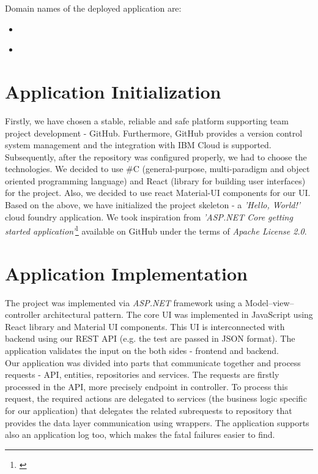 \documentclass[11pt,a4paper]{article}
\begin{document}
Domain names of the deployed application are:
\begin{itemize}
    \item \href{https://pa181.eu-de.mybluemix.net/}{\color{urlColor}{pa181.eu-de.mybluemix.net}}
    \item \href{https://pa181.eu-de.cf.appdomain.cloud/}{\color{urlColor}{pa181.eu-de.cf.appdomain.cloud}}
\end{itemize}

\section{Application Initialization}

Firstly, we have chosen a stable, reliable and safe platform supporting team project development - GitHub. Furthermore, GitHub provides a version control system management and the integration with IBM Cloud is supported. Subsequently, after the repository was configured properly, we had to choose the technologies. We decided to use \#C (general-purpose, multi-paradigm and object oriented programming language) and React (library for building user interfaces) for the project. Also, we decided to use react Material-UI components for our UI. Based on the above, we have initialized the project skeleton - a \textit{'Hello, World!'} cloud foundry application. We took inspiration from \textit{'ASP.NET Core getting started application'}\footnote{\href{https://github.com/IBM-Cloud/aspnet-core-helloworld}{\color{urlColor}{github.com/IBM-Cloud/aspnet-core-helloworld}}} available on GitHub under the terms of \textit{Apache License 2.0}.

\section{Application Implementation}

The project was implemented via \textit{ASP.NET} framework using a Model--view--controller architectural pattern. The core UI was implemented in JavaScript using React library and Material UI components. This UI is interconnected with backend using our REST API (e.g. the test are passed in JSON format). The application validates the input on the both sides - frontend and backend.\\

Our application was divided into parts that communicate together and process requests - API, entities, repositories and services. The requests are firstly processed in the API, more precisely endpoint in controller. To process this request, the required actions are delegated to services (the business logic specific for our application) that delegates the related subrequests to repository that provides the data layer communication using wrappers. The application supports also an application log too, which makes the fatal failures easier to find.
\end{document}
